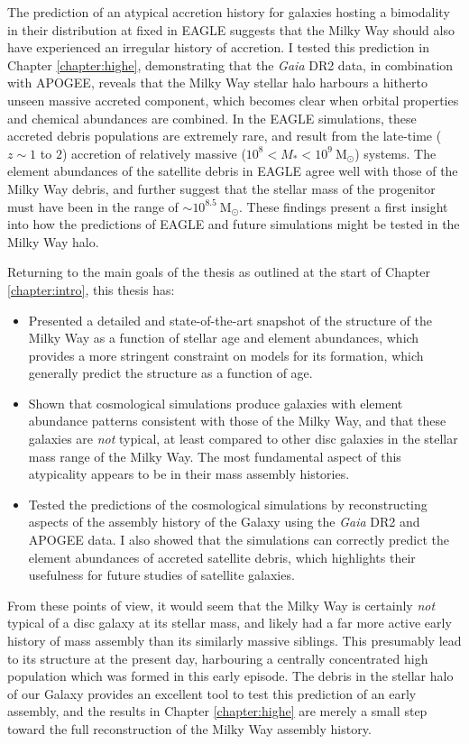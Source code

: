 The prediction of an atypical accretion history for galaxies hosting a bimodality in their \afe{} distribution at fixed \feh{} in EAGLE suggests that the Milky Way should also have experienced an irregular history of accretion. I tested this prediction in Chapter \ref{chapter:highe}, demonstrating that the \emph{Gaia} DR2 data, in combination with APOGEE, reveals that the Milky Way stellar halo harbours a hitherto unseen massive accreted component, which becomes clear when orbital properties and chemical abundances are combined. In the EAGLE simulations, these accreted debris populations are extremely rare, and result from the late-time ($z\sim 1$ to $2$) accretion of relatively massive ($10^{8} < M_{*} < 10^{9}\ \mathrm{M_{\odot}}$) systems. The element abundances of the satellite debris in EAGLE agree well with those of the Milky Way debris, and further suggest that the stellar mass of the progenitor must have been in the range of $\sim 10^{8.5}\ \mathrm{M_{\odot}}$. These findings present a first insight into how the predictions of EAGLE and future simulations might be tested in the Milky Way halo.

Returning to the main goals of the thesis as outlined at the 
start of Chapter \ref{chapter:intro}, this thesis has:
\begin{itemize}
    \item Presented a detailed and state-of-the-art snapshot of the structure of the Milky Way as a function of stellar age and element abundances, which provides a more stringent constraint on models for its formation, which generally predict the structure as a function of age.
    \item Shown that cosmological simulations produce galaxies with element abundance patterns consistent with those of the Milky Way, and that these galaxies are \emph{not} typical, at least compared to other disc galaxies in the stellar mass range of the Milky Way. The most fundamental aspect of this atypicality appears to be in their mass assembly histories.
    \item Tested the predictions of the cosmological simulations by reconstructing aspects of the assembly history of the Galaxy using the \emph{Gaia} DR2 and APOGEE data. I also showed that the simulations can correctly predict the element abundances of accreted satellite debris, which highlights their usefulness for future studies of satellite galaxies.
\end{itemize}
From these points of view, it would seem that the Milky Way is certainly \emph{not} typical of a disc galaxy at its stellar mass, and likely had a far more active early history of mass assembly than its similarly massive siblings. This presumably lead to its structure at the present day, harbouring a centrally concentrated high \afe{} population which was formed in this early episode. The debris in the stellar halo of our Galaxy provides an excellent tool to test this prediction of an early assembly, and the results in Chapter \ref{chapter:highe} are merely a small step toward the full reconstruction of the Milky Way assembly history.


